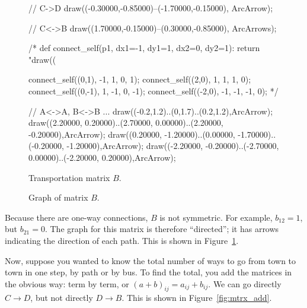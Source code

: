 \documentclass[../gatm.tex]{subfiles}
\begin{document}
\begin{figure}[h]
\begin{center}
\begin{minipage}[b]{0.45\textwidth}
\begin{asy}[width=0.7\textwidth]
				// C->D
				draw((-0.30000,-0.85000)--(-1.70000,-0.15000), ArcArrow);
				
				// C<->B
				draw((1.70000,-0.15000)--(0.30000,-0.85000), ArcArrows);
				
				/*
				def connect_self(p1, dx1=-1, dy1=1, dx2=0, dy2=1):
					return "draw((%
				
				connect_self((0,1), -1, 1, 0, 1);
				connect_self((2,0), 1, 1, 1, 0);
				connect_self((0,-1), 1, -1, 0, -1);
				connect_self((-2,0), -1, -1, -1, 0);
				*/
				
				// A<->A, B<->B ...
				draw((-0.2,1.2)..(0,1.7)..(0.2,1.2),ArcArrow);
				draw((2.20000, 0.20000)..(2.70000, 0.00000)..(2.20000, -0.20000),ArcArrow);
				draw((0.20000, -1.20000)..(0.00000, -1.70000)..(-0.20000, -1.20000),ArcArrow);
				draw((-2.20000, -0.20000)..(-2.70000, 0.00000)..(-2.20000, 0.20000),ArcArrow);
			\end{asy}
		\end{minipage}
	\end{center}
	\vspace*{-2\baselineskip}
	\begin{center}
		\begin{minipage}[t]{0.45\textwidth}
			\caption{Transportation matrix $B$.}
			\label{fig:adjacency_b}
		\end{minipage}
		\hfill
		\begin{minipage}[t]{0.45\textwidth}
			\caption{Graph of matrix $B$.}
			\label{fig:directed}
		\end{minipage}
	\end{center}
\end{figure}

\noindent Because there are one-way connections, $B$ is not symmetric. For example, $b_{12}=1$, but $b_{21}=0$. The graph for this matrix is therefore ``directed''; it has arrows indicating the direction of each path. This is shown in Figure~\ref{fig:directed}.

Now, suppose you wanted to know the total number of ways to go from town to town in one step, by path or by bus. To find the total, you add the matrices in the obvious way: term by term, or $(a+b)_{ij}=a_{ij}+b_{ij}$. We can go directly $C\to D$, but not directly $D\to B$. This is shown in Figure~\ref{fig:mtrx_add}.
\end{document}
